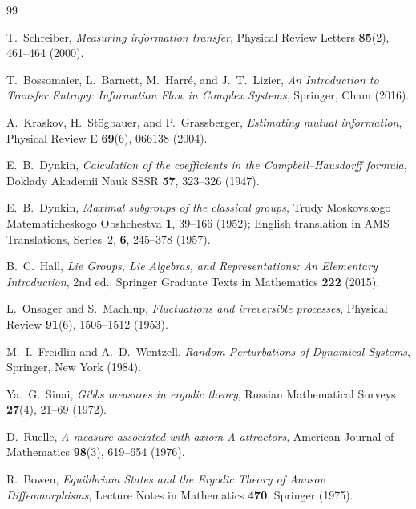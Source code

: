 \documentclass[11pt,a4paper]{article}
\theoremstyle{plain}
\theoremstyle{definition}
\theoremstyle{remark}
\begin{document}
\begin{thebibliography}{99}

T.~Schreiber,
\textit{Measuring information transfer},
Physical Review Letters \textbf{85}(2), 461--464 (2000).

T.~Bossomaier, L.~Barnett, M.~Harr\'{e}, and J.~T.~Lizier,
\textit{An Introduction to Transfer Entropy: Information Flow in Complex Systems},
Springer, Cham (2016).

A.~Kraskov, H.~St\"{o}gbauer, and P.~Grassberger,
\textit{Estimating mutual information},
Physical Review E \textbf{69}(6), 066138 (2004).

E.~B.~Dynkin,
\textit{Calculation of the coefficients in the Campbell--Hausdorff formula},
Doklady Akademii Nauk SSSR \textbf{57}, 323--326 (1947).

E.~B.~Dynkin,
\textit{Maximal subgroups of the classical groups},
Trudy Moskovskogo Matematicheskogo Obshchestva \textbf{1}, 39--166 (1952);
English translation in AMS Translations, Series~2, \textbf{6}, 245--378 (1957).

B.~C.~Hall,
\textit{Lie Groups, Lie Algebras, and Representations: An Elementary Introduction},
2nd ed., Springer Graduate Texts in Mathematics \textbf{222} (2015).

L.~Onsager and S.~Machlup,
\textit{Fluctuations and irreversible processes},
Physical Review \textbf{91}(6), 1505--1512 (1953).

M.~I.~Freidlin and A.~D.~Wentzell,
\textit{Random Perturbations of Dynamical Systems},
Springer, New York (1984).

Ya.~G.~Sinai,
\textit{Gibbs measures in ergodic theory},
Russian Mathematical Surveys \textbf{27}(4), 21--69 (1972).

D.~Ruelle,
\textit{A measure associated with axiom-A attractors},
American Journal of Mathematics \textbf{98}(3), 619--654 (1976).

R.~Bowen,
\textit{Equilibrium States and the Ergodic Theory of Anosov Diffeomorphisms},
Lecture Notes in Mathematics \textbf{470}, Springer (1975).


\end{thebibliography}
\end{document}
